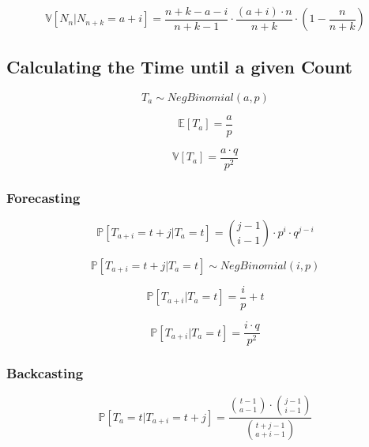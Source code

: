 \documentclass[12pt]{article}
\begin{document}
    \begin{equation}
        \mathbb{V}[N_n | N_{n+k} = a + i] = 
        \frac{n + k - a - i}{n + k - 1} \cdot 
        \frac{(a + i) \cdot n}{ n + k} \cdot 
        ( 1 - \frac{n}{n + k})
    \end{equation}

    \subsection{Calculating the Time until a given Count}
    \begin{equation}
        T_a \sim NegBinomial(a, p) 
    \end{equation}

    \begin{equation}
        \mathbb{E}[T_a] = \frac{a}{p}
    \end{equation}

    \begin{equation}
        \mathbb{V}[T_a] = \frac{a \cdot q}{p^2}
    \end{equation}


    \subsubsection{Forecasting}
    \begin{equation}
        \mathbb{P}[T_{a + i} = t + j | T_a = t] =
        \binom{j-1}{i-1} \cdot p^i \cdot q^{j-i}
    \end{equation}

    \begin{equation}
        \mathbb{P}[T_{a + i} = t + j | T_a = t] \sim NegBinomial(i, p)
    \end{equation}


    \begin{equation}
        \mathbb{P}[T_{a + i} | T_a = t] = 
        \frac{i}{p} + t
    \end{equation}

    \begin{equation}
        \mathbb{P}[T_{a + i} | T_a = t] = 
        \frac{i \cdot q}{p^2}
    \end{equation}

    \subsubsection{Backcasting}
    \begin{equation}
        \mathbb{P}[T_a = t | T_{a + i} = t + j] =
        \frac{
            \binom{t - 1}{a - 1} \cdot \binom{j - 1}{i - 1}
        }{
            \binom{t + j - 1}{a + i - 1}
        }
    \end{equation}
\end{document}
